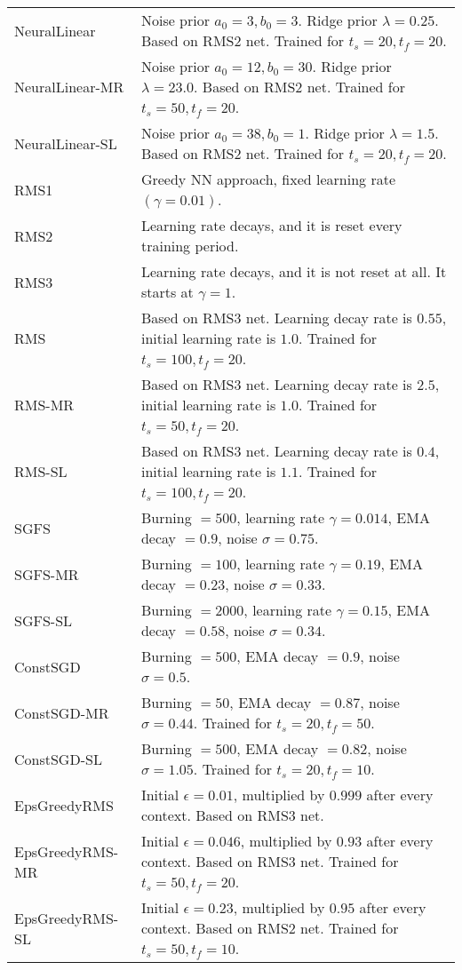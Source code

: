 \documentclass{article} \usepackage{iclr2018_conference,times}
\begin{document}
\begin{table}[ht]
\begin{adjustbox}{center}
\begin{tabular}{ll}
NeuralLinear & Noise prior $a_0 = 3, b_0 = 3$. Ridge prior $\lambda = 0.25$. Based on RMS2 net. Trained for $t_s = 20, t_f = 20$.  \\
NeuralLinear-MR & Noise prior $a_0 = 12, b_0 = 30$. Ridge prior $\lambda = 23.0$. Based on RMS2 net. Trained for $t_s = 50, t_f = 20$.  \\
NeuralLinear-SL & Noise prior $a_0 = 38, b_0 = 1$. Ridge prior $\lambda = 1.5$. Based on RMS2 net. Trained for $t_s = 20, t_f = 20$.  \\
RMS1 & Greedy NN approach, fixed learning rate $(\gamma = 0.01)$. \\
RMS2 & Learning rate decays, and it is reset every training period. \\
RMS3 & Learning rate decays, and it is not reset at all. It starts at $\gamma = 1$. \\
RMS & Based on RMS3 net. Learning decay rate is $0.55$, initial learning rate is $1.0$. Trained for $t_s = 100, t_f = 20$. \\
RMS-MR & Based on RMS3 net. Learning decay rate is $2.5$, initial learning rate is $1.0$. Trained for $t_s = 50, t_f = 20$. \\
RMS-SL & Based on RMS3 net. Learning decay rate is $0.4$, initial learning rate is $1.1$. Trained for $t_s = 100, t_f = 20$. \\
SGFS & Burning $= 500$, learning rate $\gamma = 0.014$, EMA decay $= 0.9$, noise $\sigma = 0.75$. \\
SGFS-MR & Burning $= 100$, learning rate $\gamma = 0.19$, EMA decay $= 0.23$, noise $\sigma = 0.33$. \\
SGFS-SL & Burning $= 2000$, learning rate $\gamma = 0.15$, EMA decay $= 0.58$, noise $\sigma = 0.34$. \\
ConstSGD & Burning $= 500$, EMA decay $= 0.9$, noise $\sigma = 0.5$. \\
ConstSGD-MR & Burning $= 50$, EMA decay $= 0.87$, noise $\sigma = 0.44$. Trained for $t_s = 20, t_f = 50$. \\
ConstSGD-SL & Burning $= 500$, EMA decay $= 0.82$, noise $\sigma = 1.05$. Trained for $t_s = 20, t_f = 10$. \\
EpsGreedyRMS & Initial $\epsilon = 0.01$, multiplied by $0.999$ after every context. Based on RMS3 net. \\
EpsGreedyRMS-MR & Initial $\epsilon = 0.046$, multiplied by $0.93$ after every context. Based on RMS3 net. Trained for $t_s = 50, t_f = 20$. \\
EpsGreedyRMS-SL & Initial $\epsilon = 0.23$, multiplied by $0.95$ after every context. Based on RMS2 net. Trained for $t_s = 50, t_f = 10$. \\

\end{tabular}
\end{adjustbox}
\end{table}
\end{document}
